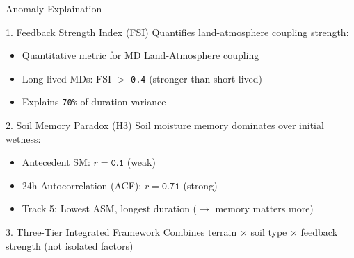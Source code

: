 \documentclass[8pt, aspectratio=169]{beamer}
\begin{document}
\begin{frame}{Anomaly Explaination}
    \vspace{-0.2cm}
    \footnotesize
    
    \begin{block}{1. Feedback Strength Index (FSI)}
        Quantifies land-atmosphere coupling strength:
        \begin{itemize}\footnotesize
            \item Quantitative metric for MD Land-Atmosphere coupling
            \item Long-lived MDs: FSI $>$ \texttt{0.4} (stronger than short-lived)
            \item Explains \texttt{70\%} of duration variance
        \end{itemize}
    \end{block}
    
    \begin{block}{2. Soil Memory Paradox (H3)}
        Soil moisture memory dominates over initial wetness:
        \begin{itemize}\footnotesize
            \item Antecedent SM: $r = \texttt{0.1}$ (weak)
            \item 24h Autocorrelation (ACF): $r = \texttt{0.71}$ (strong)
            \item Track 5: Lowest ASM, longest duration ($\rightarrow$ memory matters more)
        \end{itemize}
    \end{block}
 
    \begin{block}{3. Three-Tier Integrated Framework}
        Combines terrain $\times$ soil type $\times$ feedback strength (not isolated factors)
    \end{block}
\end{frame}
\end{document}
